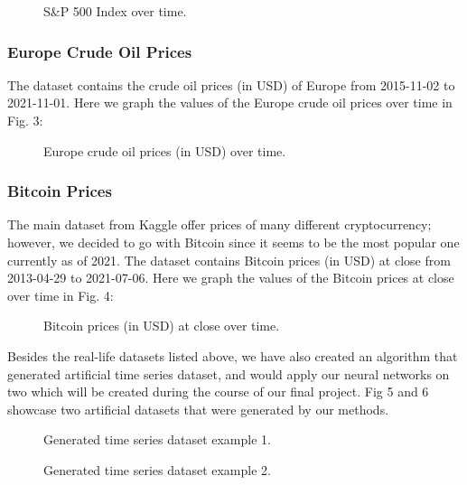 \documentclass[letterpaper, 10 pt, conference]{ieeeconf}  %
\begin{document}
    \begin{figure}[thpb]
        \centering
        \caption{S\&P 500 Index over time.}
        \label{figurelabel}
     \end{figure}

     \subsubsection{Europe Crude Oil Prices} The dataset contains the crude oil prices (in USD) of Europe from 2015-11-02 to 2021-11-01. Here we graph the values of the Europe crude oil prices over time in Fig. 3:

     \begin{figure}[thpb]
         \centering
         \caption{Europe crude oil prices (in USD) over time.}
         \label{figurelabel}
      \end{figure}

      \subsubsection{Bitcoin Prices} The main dataset from Kaggle offer prices of many different cryptocurrency; however, we decided to go with Bitcoin since it seems to be the most popular one currently as of 2021. The dataset contains Bitcoin prices (in USD) at close from 2013-04-29 to 2021-07-06. Here we graph the values of the Bitcoin prices at close over time in Fig. 4:

      \begin{figure}[thpb]
          \centering
          \caption{Bitcoin prices (in USD) at close over time.}
          \label{figurelabel}
       \end{figure}

    Besides the real-life datasets listed above, we have also created an algorithm that generated artificial time series dataset, and would apply our neural networks on two which will be created during the course of our final project. Fig 5 and 6 showcase two artificial datasets that were generated by our methods.
    \begin{figure}[thpb]
        \centering
        \caption{Generated time series dataset example 1.}
        \label{figurelabel}
     \end{figure}
     \begin{figure}[thpb]
        \centering
        \caption{Generated time series dataset example 2.}
        \label{figurelabel}
     \end{figure}
\end{document}
